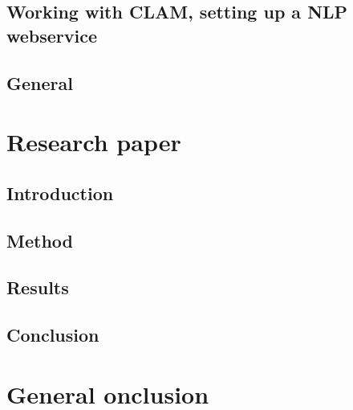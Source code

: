 \documentclass[12pt]{article}
\begin{document}
\subsection{Working with CLAM, setting up a NLP webservice}

\subsection{General}


\section{Research paper}

\subsection{Introduction}

\subsection{Method}

\subsection{Results}

\subsection{Conclusion}

\section{General onclusion}
\end{document}
